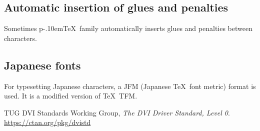 \documentclass[a4paper,11pt]{article}
\def\pTeX{p\kern-.10em\TeX}
\begin{document}
\subsection{Automatic insertion of glues and penalties}

Sometimes \pTeX\ family automatically inserts glues and penalties
between characters.

\subsection{Japanese fonts}

For typesetting Japanese characters, a JFM (Japanese \TeX\ font metric)
format is used. It is a modified version of \TeX\ TFM.



\newpage

\begin{thebibliography}{99}
  TUG DVI Standards Working Group,
  \textit{The DVI Driver Standard, Level 0}.\\
  \url{https://ctan.org/pkg/dvistd}
\end{thebibliography}

\newpage
\printindex
\end{document}
